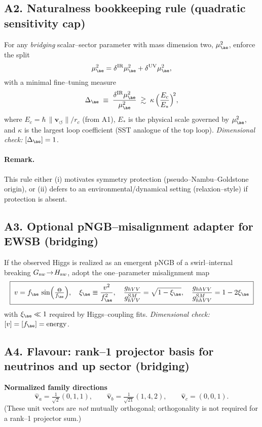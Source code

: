 \documentclass[11pt]{article}
\begin{document}
      \subsection*{A2. Naturalness bookkeeping rule (quadratic sensitivity cap)}
          For any \emph{bridging} scalar–sector parameter with mass dimension two, $\mu_{\ae}^2$, enforce the split
          \[
              \mu_{\ae}^2=\delta^{\mathrm{IR}}\mu_{\ae}^2+\delta^{\mathrm{UV}}\mu_{\ae}^2,
          \]
          with a minimal fine–tuning measure
          \[
              \Delta_{\ae}\;\equiv\;\frac{\delta^{\mathrm{IR}}\mu_{\ae}^2}{\mu_{\ae}^2}
              \;\gtrsim\; \kappa\,\Big(\frac{E_c}{E_*}\Big)^{\!2},
          \]
          where $E_c=\hbar\,\|\mathbf v_{\!\circlearrowleft}\|/r_c$ (from A1), $E_*$ is the physical scale governed by $\mu_{\ae}^2$, and $\kappa$ is the largest loop coefficient (SST analogue of the top loop). \textit{Dimensional check:} $[\Delta_{\ae}]=1$.

          \paragraph{Remark.} This rule either (i) motivates symmetry protection (pseudo–Nambu–Goldstone origin), or (ii) defers to an environmental/dynamical setting (relaxion–style) if protection is absent.

  \subsection*{A3. Optional pNGB–misalignment adapter for EWSB (bridging)}
      If the observed Higgs is realized as an emergent pNGB of a swirl–internal breaking $G_{\textrm sw}\!\to\! H_{\textrm sw}$, adopt the one–parameter misalignment map
      \[
          \boxed{\;
          v=f_{\ae}\,\sin\!\Big(\tfrac{\Theta}{f_{\ae}}\Big),\quad \xi_{\ae}\equiv\frac{v^2}{f_{\ae}^2},\quad
          \frac{g_{hVV}}{g_{hVV}^{\textrm SM}}=\sqrt{1-\xi_{\ae}},\quad
          \frac{g_{hhVV}}{g_{hhVV}^{\textrm SM}}=1-2\xi_{\ae} \;}
      \]
      with $\xi_{\ae}\ll1$ required by Higgs–coupling fits. \textit{Dimensional check:} $[v]=[f_{\ae}]=\mathrm{energy}$.

  \subsection*{A4. Flavour: rank–1 projector basis for neutrinos and up sector (bridging)}

      \textbf{Normalized family directions}
      \[
          \hat{\mathbf v}_a=\tfrac{1}{\sqrt{2}}(0,1,1),\qquad
          \hat{\mathbf v}_b=\tfrac{1}{\sqrt{21}}(1,4,2),\qquad
          \hat{\mathbf v}_c=(0,0,1).
      \]
      (These unit vectors are \emph{not} mutually orthogonal; orthogonality is not required for a rank–1 projector sum.)
\end{document}
